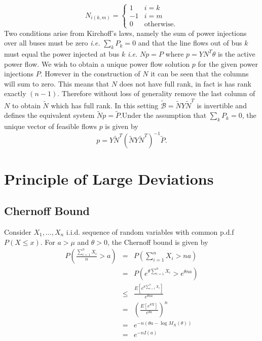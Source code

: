 \documentclass{article}
\newcommand{\ie}{\textit{i.e. }}
\newcommand{\iid}{i.i.d. }
\begin{document}
\begin{equation}
N_{i(k,m)} = \begin{cases}
1 & i=k\\
-1 & i=m\\
0 & \text{otherwise}.
\end{cases}
\end{equation}
Two conditions arise from Kirchoff's laws, namely the sum of power injections over all buses must be zero \ie $\sum_{k}P_k=0$ and that the line flows out of bus $k$ must equal the power injected at bus $k$ \ie $Np=P$ where $p=YN^T\theta$ is the active power flow. We wish to obtain a unique power flow solution $p$ for the given power injections $P$. However in the construction of $N$ it can be seen that the columns will sum to zero. This means that $N$ does not have full rank, in fact is has rank exactly $(n-1)$. Therefore without loss of generality remove the last column of $N$ to obtain $\tilde N$ which has full rank. In this setting $\tilde{\mathcal{B}}=\tilde N Y \tilde N^T$ is invertible and defines the equivalent system $\tilde N p = \tilde P$.Under the assumption that $\sum_{k}P_k=0$, the unique vector of feasible flows $p$ is given by
\begin{equation}
p = Y\tilde N^T(\tilde N Y \tilde N^T)^{-1}\tilde P.
\end{equation}

\section{Principle of Large Deviations}

\subsection{Chernoff Bound}
Consider $X_1,\dots,X_n$ \iid sequence of random variables with common p.d.f $P(X\le x)$. For $a>\mu$ and $\theta >0$, the Chernoff bound is given by
\begin{eqnarray*}
P\left(\frac{\sum_{i=1}^{n} X_i }{n}>a\right) &=& P\left(\sum_{i=1}^{n}  X_i > na \right)\\
&=& P\left(e^{\theta \sum_{i=1}^{n}  X_i} > e^{\theta na} \right)\\
&\le & \frac{E[e^{\theta \sum_{i=1}^{n}  X_i}]}{e^{\theta na}} \\
&=& \left(\frac{E[e^{\theta X}]}{e^{\theta a}} \right)^n\\
&=& e^{-n(\theta a - \log M_X(\theta))}\\
&=& e^{-n I(a)}
\end{eqnarray*}
\end{document}
